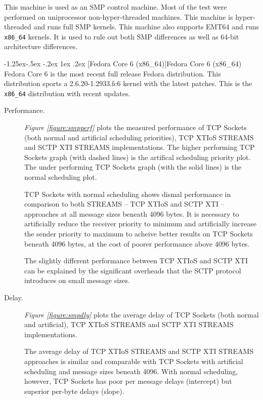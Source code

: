 \documentclass[letterpaper,final,notitlepage,twocolumn,10pt,twoside]{article}
\makeatletter
\renewcommand\subsubsection{\@startsection{subsubsection}{3}{\z@}%
                                     {-1.25ex\@plus -.5ex \@minus -.2ex}%
                                     {1ex \@plus .2ex}%
                                     {\normalfont\normalsize\bfseries}}
\makeatother
\begin{document}
This machine is used as an SMP control machine.  Most of the test were performed on uniprocessor
non-hyper-threaded machines.  This machine is hyper-threaded and runs full SMP kernels.  This
machine also supports EMT64 and runs \texttt{x86\_64} kernels.  It is used to rule out both SMP
differences as well as 64-bit architecture differences.

\subsubsection[Fedora Core 6 (x86\_64)]{Fedora Core 6 (x86\_64)} Fedora Core 6 is the most recent
full release Fedora distribution.  This distribution sports a 2.6.20-1.2933.fc6 kernel with the
latest patches.  This is the \texttt{x86\_64} distribution with recent updates.

\begin{description}

\item[Performance.]

\textit{Figure \ref{figure:smpperf}}
plots the measured performance of TCP Sockets (both normal and artificial scheduling priorities),
TCP XTIoS STREAMS and SCTP XTI STREAMS implementations.
The higher performing TCP Sockets graph (with dashed lines) is the artifical scheduling priority
plot.  The under performing TCP Sockets graph (with the solid lines) is the normal scheduling plot.

TCP Sockets with normal scheduling shows dismal performance in comparison to both STREAMS -- TCP
XTIoS and SCTP XTI -- approaches at all message sizes beneath 4096 bytes.  It is necessary to
artificially reduce the receiver priority to minimum and artificially increase the sender priority
to maximum to acheive better results on TCP Sockets beneath 4096 bytes, at the cost of poorer
performance above 4096 bytes.

The slightly different performance between TCP XTIoS and SCTP XTI can be explained by the
significant overheads that the SCTP protocol introduces on small message sizes.

\item[Delay.]

\textit{Figure \ref{figure:smpdly}}
plots the average delay of TCP Sockets (both normal and artificial), TCP XTIoS STREAMS and SCTP XTI
STREAMS implementations.

The average delay of TCP XTIoS STREAMS and SCTP XTI STREAMS approaches is similar and comparable
with TCP Sockets with artificial scheduling and message sizes beneath 4096.  With normal scheduling,
however, TCP Sockets has poor per message delays (intercept) but superior per-byte delays (slope).


\end{description}
\end{document}
